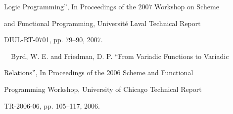 \noindent \hspace{1cm} Logic Programming'', In Proceedings of the 2007 Workshop on Scheme 

\noindent \hspace{1cm} and Functional Programming, Universit\'{e} Laval Technical Report 

\noindent \hspace{1cm} DIUL-RT-0701, pp. 79--90, 2007.

\medskip

\noindent\ \ Byrd, W. E. and Friedman, D. P. ``From Variadic Functions to Variadic

\noindent \hspace{1cm} Relations'', In Proceedings of the 2006 Scheme and Functional

\noindent \hspace{1cm} Programming Workshop, University of Chicago Technical Report 

\noindent \hspace{1cm} TR-2006-06, pp. 105--117, 2006.






